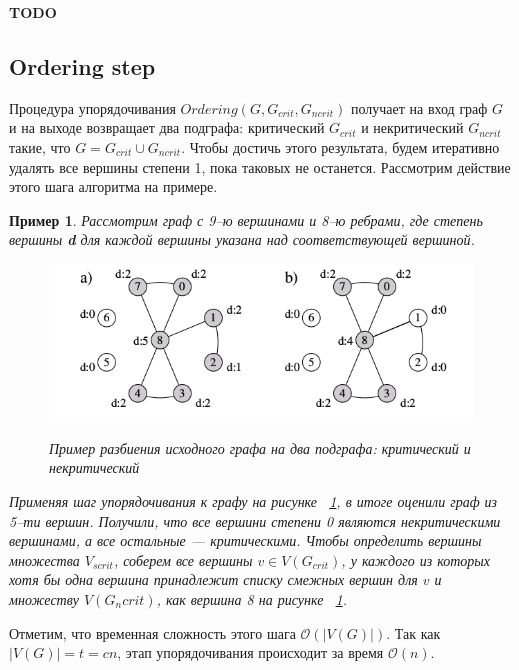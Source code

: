 \documentclass[specialist,
               substylefile = spbu.rtx,
               subf,href,colorlinks=true, 12pt]{disser}
\newtheorem{myexample}{Пример}
\begin{document}
\textbf{TODO}

\newpage

\subsection{Ordering step}

Процедура упорядочивания $Ordering (G, G_{crit}, G_{ncrit})$ получает на вход граф $G$ и на выходе возвращает два подграфа: критический $G_{crit}$ и некритический $G_{ncrit}$ такие, что $G = G_{crit} \cup G_{ncrit}$. Чтобы достичь этого результата, будем итеративно удалять все вершины степени 1, пока таковых не останется. Рассмотрим действие этого шага алгоритма на примере.

\begin{myexample}
Рассмотрим граф с 9--ю вершинами и 8--ю ребрами, где степень вершины \textbf{d} для каждой вершины указана над соответствующей вершиной.

\begin{figure}[h]
\begin{center}
\includegraphics[scale=0.5]{imgs/ex2.jpg}\label{im:ex2}
\caption{Пример разбиения исходного графа на два подграфа: критический и некритический}
\end{center}
\end{figure}

Применяя шаг упорядочивания к графу на рисунке ~\ref{im:ex2}, в итоге оценили граф из 5--ти вершин. Получили, что все вершини степени 0 являются некритическими вершинами, а все остальные --- критическими. Чтобы определить вершины множества $V_{scrit}$, соберем все вершины $v \in V(G_{crit})$, у каждого из которых хотя бы одна вершина принадлежит списку смежных вершин для $v$ и множеству $V(G_ncrit)$, как вершина 8 на рисунке ~\ref{im:ex2}.
\end{myexample}

Отметим, что временная сложность этого шага $\mathcal{O}(|V(G)|)$. Так как $|V(G)| = t = cn$, этап упорядочивания происходит за время $\mathcal{O}(n)$.
\end{document}
